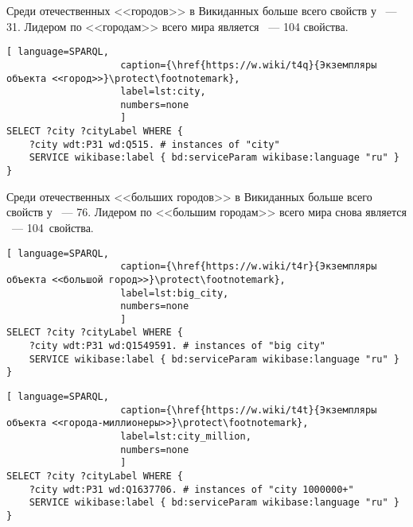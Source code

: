 Среди отечественных <<городов>> в Викиданных больше всего свойств 
у ~--- 31. %
Лидером по <<городам>> всего мира является ~--- 104 свойства.

\begin{lstlisting}[ language=SPARQL, 
                    caption={\href{https://w.wiki/t4q}{Экземпляры объекта <<город>>}\protect\footnotemark},
                    label=lst:city,
                    numbers=none
                    ]
SELECT ?city ?cityLabel WHERE {
	?city wdt:P31 wd:Q515. # instances of "city"
	SERVICE wikibase:label { bd:serviceParam wikibase:language "ru" }
}
\end{lstlisting}

Среди отечественных <<больших городов>> в Викиданных больше всего свойств 
у ~--- 76. %
Лидером по <<большим городам>> всего мира снова является ~--- 104~свойства.

\begin{lstlisting}[ language=SPARQL, 
                    caption={\href{https://w.wiki/t4r}{Экземпляры объекта <<большой город>>}\protect\footnotemark},
                    label=lst:big_city,
                    numbers=none
                    ]
SELECT ?city ?cityLabel WHERE {
	?city wdt:P31 wd:Q1549591. # instances of "big city"    
	SERVICE wikibase:label { bd:serviceParam wikibase:language "ru" }
}
\end{lstlisting}




\newpage
\begin{lstlisting}[ language=SPARQL, 
                    caption={\href{https://w.wiki/t4t}{Экземпляры объекта <<города-миллионеры>>}\protect\footnotemark},
                    label=lst:city_million,
                    numbers=none
                    ]
SELECT ?city ?cityLabel WHERE {
	?city wdt:P31 wd:Q1637706. # instances of "city 1000000+" 
	SERVICE wikibase:label { bd:serviceParam wikibase:language "ru" }
}
\end{lstlisting}

